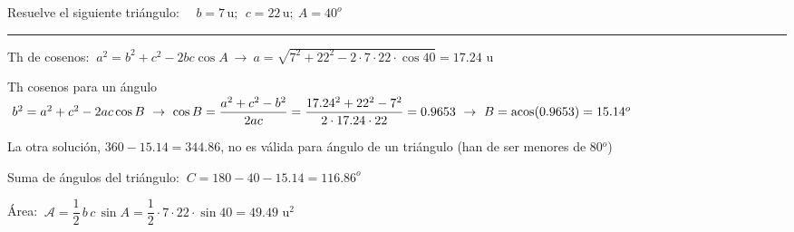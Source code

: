 \begin{miejercicio}

Resuelve el siguiente triángulo: $\quad  b=7 \, \mathrm{u};\ \ c=22 \, \mathrm{u} ; \ A=40^o$

\rule{250pt}{0.1pt}

\vspace{2mm} Th de cosenos: $\ a^2=b^2+c^2-2bc\cos A \ \to \ a=\sqrt{7^2+22^2-2\cdot 7\cdot 22 \cdot \cos 40}= 17.24\, \, \mathrm{u}$ 

\vspace{2mm} Th cosenos para un ángulo $\ b^2=a^2+c^2-2ac\cos B \ \to \ \cos B=\dfrac{a^2+c^2-b^2}{2ac}=\dfrac{17.24^2+22^2-7^2}{2\cdot 17.24\cdot 22}= 0.9653 \ \to \ B=\acos (0.9653)= 15.14^o \quad $ 

\vspace{2mm} \textcolor{gris}{La otra solución, $360-15.14=344.86$, no es válida para ángulo de un triángulo (han de ser menores de 	80$^o$)}

\vspace{2mm} Suma de ángulos del triángulo: $\ C=180-40-15.14=116.86^o$

\vspace{2mm} Área: $\ \mathcal A=\dfrac 1 2 \, b \, c \, \sin A = \dfrac 1 2 \cdot 7 \cdot 22 \cdot  \sin 40 = 49.49\, \, \mathrm{u}^2$
	
\end{miejercicio}


